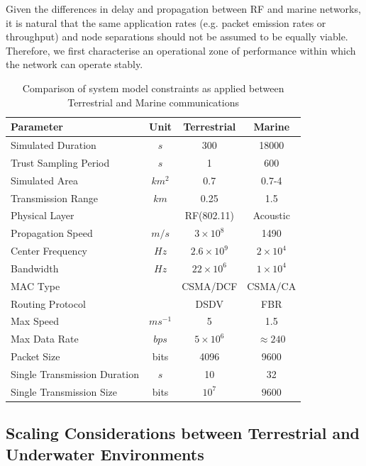 \documentclass[conference]{IEEEtran}
\begin{document}
Given the differences in delay and propagation between RF and marine networks, it is natural that the same application rates (e.g. packet emission rates or throughput) and node separations should not be assumed to be equally viable.
Therefore, we first characterise an operational zone of performance within which the network can operate stably.
%
\begin{table}[h]
  \caption{Comparison of system model constraints as applied between Terrestrial and Marine communications} \label{tab:sysconstraints}
  \begin{center}
    \setlength{\tabcolsep}{8pt}
    \begin{tabular}{lccc}
      \toprule
      Parameter & Unit & Terrestrial & Marine \\
      \midrule
      Simulated Duration & $s$ & 300 & 18000\\
      Trust Sampling Period & $s$ & 1 & 600 \\
      Simulated Area & $km^2$ & 0.7 & 0.7-4 \\
      Transmission Range & $km$ & 0.25 & 1.5 \\
      Physical Layer & & RF(802.11) & Acoustic\\
      Propagation Speed& $m/s$ & $3\times10^8$ & 1490\\
      Center Frequency& $Hz$ & $2.6\times10^9$ & $2 \times 10^4$ \\
      Bandwidth& $Hz$ & $22\times10^6$ & $1\times10^4$\\
      MAC Type & & CSMA/DCF & CSMA/CA\\
      Routing Protocol & & DSDV & FBR \\
      Max Speed & $ms^{-1}$ & 5 & 1.5 \\
      Max Data Rate & $bps$ & $5\times10^6$ & $\approx 240$ \\
      Packet Size & bits & 4096 &  9600 \\
      Single Transmission Duration & $s$ & 10 & 32 \\
      Single Transmission Size & bits & $10^7$ & $9600$ \\
      \bottomrule
    \end{tabular}
    \setlength{\tabcolsep}{6pt}
  \end{center}
\end{table}
%


\subsection{Scaling Considerations between Terrestrial and Underwater Environments}
\end{document}
